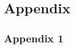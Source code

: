 \documentclass[onesided]{article}\usepackage[]{graphicx}\usepackage[]{color}
\begin{document}
\begin{center}
\dotfill
{} \dotfill
\dotfill
{}
\end{center}

\clearpage






\setcounter{table}{0}
\renewcommand{\thetable}{A\arabic{table}}
\setcounter{figure}{0}
\renewcommand{\thefigure}{A\arabic{figure}}

\newpage
{}
\setcounter{page}{1}

\section{Appendix}\hypertarget{appendix}{}



\subsection{Appendix 1}



\linespread{2}
\end{document}
